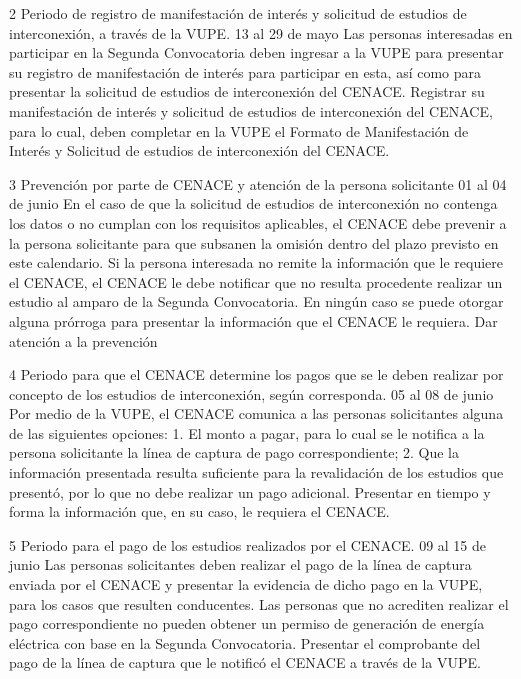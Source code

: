  2
 Periodo de registro de manifestación de interés y solicitud de estudios de interconexión, a través de la VUPE.
 13 al 29 de mayo
 Las personas interesadas en participar en la Segunda Convocatoria deben ingresar a la VUPE para presentar su registro de manifestación de interés para participar en esta, así como para presentar la solicitud de estudios de interconexión del CENACE.
 Registrar su manifestación de interés y solicitud de estudios de interconexión del CENACE, para lo cual, deben completar en la VUPE el Formato de Manifestación de Interés y Solicitud de estudios de interconexión del CENACE.
 
 3
 Prevención por parte de CENACE y atención de la persona solicitante
 01 al 04 de junio
 En el caso de que la solicitud de estudios de interconexión no contenga los datos o no cumplan con los requisitos aplicables, el CENACE debe prevenir a la persona solicitante para que subsanen la omisión dentro del plazo previsto en este calendario.
Si la persona interesada no remite la información que le requiere el CENACE, el CENACE le debe notificar que no resulta procedente realizar un estudio al amparo de la Segunda Convocatoria.
En ningún caso se puede otorgar alguna prórroga para presentar la información que el CENACE le requiera.
 Dar atención a la prevención
 
 4
 Periodo para que el CENACE determine los pagos que se le deben realizar por concepto de los estudios de interconexión, según corresponda.
 05 al 08 de junio
 Por medio de la VUPE, el CENACE comunica a las personas solicitantes alguna de las siguientes opciones:
1. El monto a pagar, para lo cual se le notifica a la persona solicitante la línea de captura de pago correspondiente;
2. Que la información presentada resulta suficiente para la revalidación de los estudios que presentó, por lo que no debe realizar un pago adicional.
 Presentar en tiempo y forma la información que, en su caso, le requiera el CENACE.
 
 5
 Periodo para el pago de los estudios realizados por el CENACE.
 09 al 15 de junio
 Las personas solicitantes deben realizar el pago de la línea de captura enviada por el CENACE y presentar la evidencia de dicho pago en la VUPE, para los casos que resulten conducentes. Las personas que no acrediten realizar el pago correspondiente no pueden obtener un permiso de generación de energía eléctrica con base en la Segunda Convocatoria.
 Presentar el comprobante del pago de la línea de captura que le notificó el CENACE a través de la VUPE.
 
